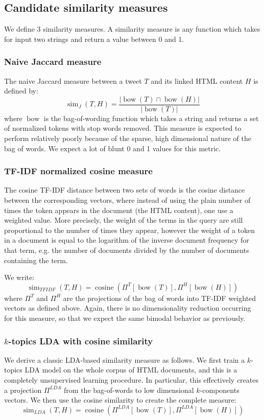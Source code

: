 \documentclass[times, 11pt, twocolumn]{article}
\DeclareMathOperator*{\bow}{bow}
\DeclareMathOperator*{\simil}{sim}
\DeclareMathOperator*{\cosine}{cosine}
\begin{document}
\subsection{Candidate similarity measures}
We define 3 similarity measures. A similarity measure is any function which takes for input two strings and return a value between 0 and 1.

\subsubsection{Naive Jaccard measure}
The naive Jaccard measure between a tweet $T$ and its linked HTML content $H$ is defined by:
\[
	\simil_{J}(T, H) = \frac{|\bow(T) \cap \bow(H)|}{|\bow(T)|}
\]
where $\bow$ is the bag-of-wording function which takes a string and returns a set of normalized tokens with stop words removed. This measure is expected to perform relatively poorly because of the sparse, high dimensional nature of the bag of words. We expect a lot of blunt 0 and 1 values for this metric.

\subsubsection{TF-IDF normalized cosine measure}
The cosine TF-IDF distance between two sets of words is the cosine distance between 
the corresponding vectors, where instead of using the plain number of times the 
token appears in the document (the HTML content), one use a weighted value. 
More precisely, the weight of the terms in the query are still 
proportional to the number of times they appear, however the weight of a token
in a document is equal to the logarithm of the inverse document frequency for that
term, e.g. the number of documents divided by the number of documents containing
the term.

We write:
\[
	\simil_{TFIDF}(T, H) = \cosine (\Pi^{T}[\bow(T)], \Pi^{H}[\bow(H)])
\]
where $\Pi^T$ and $\Pi^H$ are the projections of the bag of words into TF-IDF
weighted vectors as defined above. Again, there is no dimensionality reduction 
occurring for this measure, so that we expect the same bimodal behavior as previously.

\subsubsection{$k$-topics LDA with cosine similarity}
We derive a classic LDA-based similarity measure as follows. We first train a $k$-topics LDA model
on the whole corpus of HTML documents, and this is a completely unsupervised learning procedure. 
In particular, this effectively creates a projection $\Pi^{LDA}$ from the bag-of-words to low 
dimensional $k$-components vectors. We then use the cosine similarity to create the complete measure:
\[
	\simil_{LDA}(T, H) = \cosine (\Pi^{LDA}[\bow(T)], \Pi^{LDA}[\bow(H)])
\]
\end{document}
